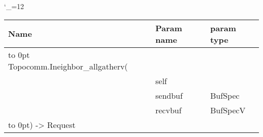 \begingroup \catcode`\_=12 \tt
\begin{tabular}{lll}
\toprule
\textrm{Name}&\textrm{Param name}&\textrm{param type}\\
\midrule
\hbox to 0pt {Topocomm.Ineighbor_allgatherv(\hss}\\
& self\\
& sendbuf & BufSpec\\
& recvbuf & BufSpecV\\
\hbox to 0pt{) -> Request\hss}\\
\bottomrule
\end{tabular}
\endgroup
